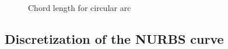     \begin{figure}[h!]
        \centering
        \caption{Chord length for circular arc}
        \label{qt_fig:iges_chord_ratio}
    \end{figure}
%
\subsection{Discretization of the NURBS curve}
